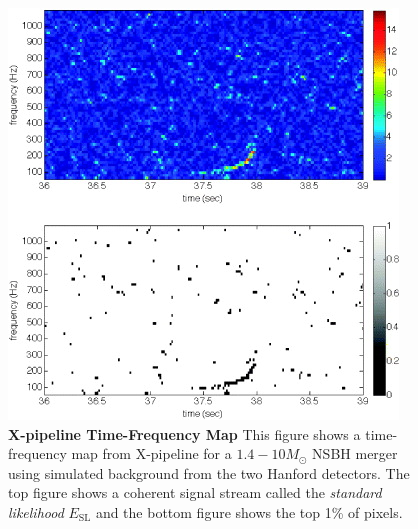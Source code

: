 \documentclass[11pt]{cuthesis}
\newcommand{\xp}{X-pipeline }
\begin{document}
\begin{figure} %
\begin{center}
\includegraphics[width=0.8\linewidth]{xpipelineTFmap.jpg}
\end{center}
\caption{\textbf{\xp Time-Frequency Map} This figure shows a time-frequency map from \xp for a $1.4-10 M_\odot$ NSBH merger using simulated background from the two Hanford detectors. The top figure shows a coherent signal stream called the \textit{standard likelihood} $E_\text{SL}$ and the bottom figure shows the top 1\% of pixels. \cite{xpipeline} } 
\label{fig:tfmap}
\end{figure}
\end{document}
